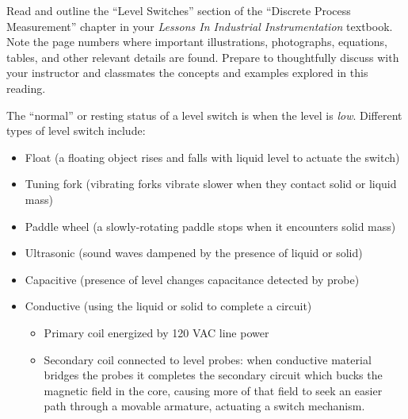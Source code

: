 

Read and outline the ``Level Switches'' section of the ``Discrete Process Measurement'' chapter in your {\it Lessons In Industrial Instrumentation} textbook.  Note the page numbers where important illustrations, photographs, equations, tables, and other relevant details are found.  Prepare to thoughtfully discuss with your instructor and classmates the concepts and examples explored in this reading.














The ``normal'' or resting status of a level switch is when the level is {\it low}.  Different types of level switch include:

\begin{itemize}
\item{} Float (a floating object rises and falls with liquid level to actuate the switch)
\begin{itemize}

\end{itemize}
\item{} Tuning fork (vibrating forks vibrate slower when they contact solid or liquid mass)
\item{} Paddle wheel (a slowly-rotating paddle stops when it encounters solid mass)
\begin{itemize}

\end{itemize}
\item{} Ultrasonic (sound waves dampened by the presence of liquid or solid)
\item{} Capacitive (presence of level changes capacitance detected by probe)
\item{} Conductive (using the liquid or solid to complete a circuit)
\begin{itemize}

\item{} Primary coil energized by 120 VAC line power
\item{} Secondary coil connected to level probes: when conductive material bridges the probes it completes the secondary circuit which bucks the magnetic field in the core, causing more of that field to seek an easier path through a movable armature, actuating a switch mechanism.
\end{itemize}
\end{itemize}





